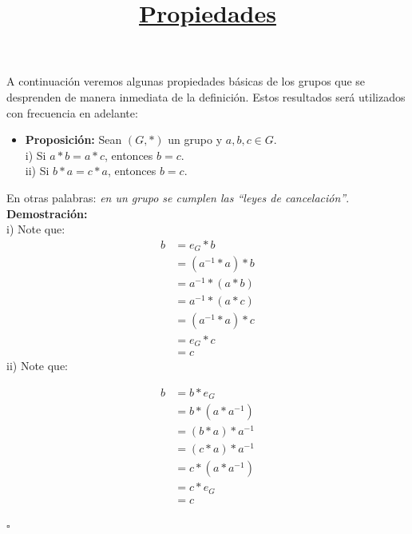 \documentclass[10 pt]{article}
\title{\textbf{\underline{Propiedades}}}
\author{}
\date{}
\begin{document}
\pagestyle{empty}
\maketitle
\thispagestyle{empty}

\section*{}

\Large{A continuación veremos algunas propiedades básicas de los grupos que se desprenden de manera inmediata de la definición. Estos resultados será utilizados con frecuencia en adelante:} \\

\begin{itemize}
    \item \Large{\textbf{Proposición:} Sean $(G,*)$ un grupo y $a,b,c \in G$. \\

    i) Si $a*b=a*c$, entonces $b=c$. \\

    ii) Si $b*a=c*a$, entonces $b=c$.} \\
\end{itemize}

\Large{En otras palabras: \textit{en un grupo se cumplen las ``leyes de cancelación''}.} \\

\Large{\textbf{Demostración:} \\

i) Note que:
\begin{align*}
    b&=e_G*b \\
    &=(a^{-1}*a)*b \\
    &=a^{-1}*(a*b) \\
    &=a^{-1}*(a*c) \\
    &=(a^{-1}*a)*c \\
    &=e_G*c \\
    &=c
\end{align*}
ii) Note que:}

\begin{align*}
    b&=b*e_G \\
    &=b*(a*a^{-1}) \\
    &=(b*a)*a^{-1} \\
     &=(c*a)*a^{-1} \\ 
    &=c*(a*a^{-1}) \\
    &=c*e_G \\
    &=c
\end{align*}
\begin{flushright}
   $\square$
\end{flushright}
\end{document}
